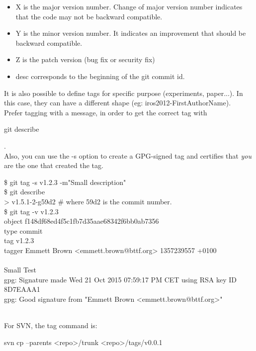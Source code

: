 \begin{itemize}[noitemsep,topsep=0pt,parsep=0pt,partopsep=0pt]
\item X is the major version number. Change of major version number indicates that the code may not be backward compatible.
\item Y is the minor version number. It indicates an improvement that should be backward compatible.
\item Z is the patch version (bug fix or security fix) 
\item desc corresponds to the beginning of the git commit id.
\end{itemize}

It is also possible to define tags for specific purpose (experiments, paper...).
In this case, they can have a different shape (eg: iros2012-FirstAuthorName).\\


Prefer tagging with a message, in order to get the correct tag with \begin{tt}git describe\end{tt}.\\
Also, you can use the -s option to create a GPG-signed tag and certifies that \textit{you} are the one that created the tag.

\begin{tt}
\$ git tag -s v1.2.3 -m"Small description"\\
\$ git describe\\
> v1.5.1-2-g59d2 \# where 59d2 is the commit number.\\
\$ git tag -v v1.2.3\\
object f148df68ed4f5c1fb7d35aae68342f6bb0ab7356\\
type commit\\
tag v1.2.3\\
tagger Emmett Brown <emmett.brown@bttf.org> 1357239557 +0100\\
~\\
Small Test\\
gpg: Signature made Wed 21 Oct 2015 07:59:17 PM CET using RSA key ID 8D7EAAA1\\
gpg: Good signature from "Emmett Brown <emmett.brown@bttf.org>"\\
\end{tt}
~\\
For SVN, the tag command is:\\ 
\begin{tt}svn cp --parents <repo>/trunk <repo>/tags/v0.0.1\end{tt}\\

